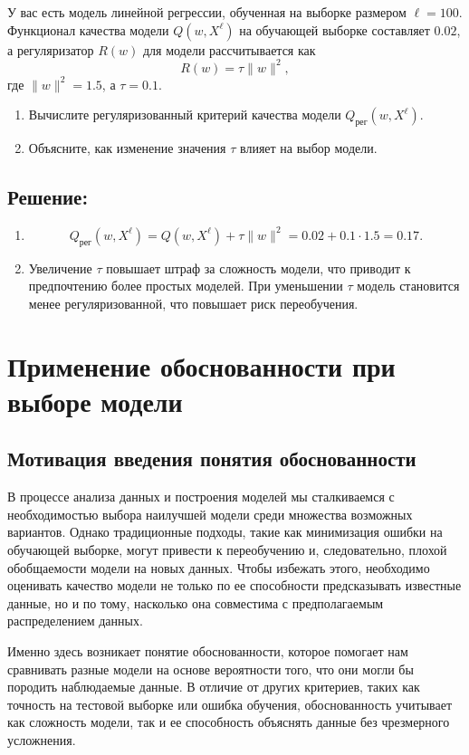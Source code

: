 У вас есть модель линейной регрессии, обученная на выборке размером $\ell = 100$. Функционал качества модели $Q(w, X^\ell)$ на обучающей выборке составляет $0.02$, а регуляризатор $R(w)$ для модели рассчитывается как
\[
    R(w) = \tau \|w\|^2,
\]
где $\|w\|^2 = 1.5$, а $\tau = 0.1$.

\begin{enumerate}
    \item Вычислите регуляризованный критерий качества модели $Q_{\text{рег}}(w, X^\ell)$.
    \item Объясните, как изменение значения $\tau$ влияет на выбор модели.
\end{enumerate}

\subsection*{Решение:}

\begin{enumerate}
    \item
          \[
              Q_{\text{рег}}(w, X^\ell) = Q(w, X^\ell) + \tau \|w\|^2 = 0.02 + 0.1 \cdot 1.5 = 0.17.
          \]
    \item Увеличение $\tau$ повышает штраф за сложность модели, что приводит к предпочтению более простых моделей. При уменьшении $\tau$ модель становится менее регуляризованной, что повышает риск переобучения.
\end{enumerate}

\section{Применение обоснованности при выборе модели}

\subsection{Мотивация введения понятия обоснованности}

В процессе анализа данных и построения моделей мы сталкиваемся с необходимостью выбора наилучшей модели среди множества возможных вариантов. Однако традиционные подходы, такие как минимизация ошибки на обучающей выборке, могут привести к переобучению и, следовательно, плохой обобщаемости модели на новых данных. Чтобы избежать этого, необходимо оценивать качество модели не только по ее способности предсказывать известные данные, но и по тому, насколько она совместима с предполагаемым распределением данных.

Именно здесь возникает понятие обоснованности, которое помогает нам сравнивать разные модели на основе вероятности того, что они могли бы породить наблюдаемые данные. В отличие от других критериев, таких как точность на тестовой выборке или ошибка обучения, обоснованность учитывает как сложность модели, так и ее способность объяснять данные без чрезмерного усложнения.

